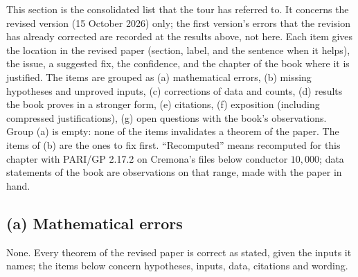 \begin{sloppypar}
This section is the consolidated list that the tour has referred to. It concerns the revised version (15 October 2026) only; the first version's errors that the
revision has already corrected are recorded at the results above, not here. Each item gives the location in the revised paper (section, label, and the sentence when
it helps), the issue, a suggested fix, the confidence, and the chapter of the book where it is justified. The items are grouped as (a) mathematical errors, (b) missing
hypotheses and unproved inputs, (c) corrections of data and counts, (d) results the book proves in a stronger form, (e) citations, (f) exposition (including compressed
justifications), (g) open questions with the book's observations. Group (a) is empty: none of the items invalidates a theorem of the paper. The items of (b) are the ones to
fix first. ``Recomputed'' means recomputed for this chapter with PARI/GP 2.17.2 on Cremona's files below conductor $10{,}000$; data statements of the book are observations on
that range, made with the paper in hand.

\subsection*{(a) Mathematical errors}
None. Every theorem of the revised paper is correct as stated, given the inputs it names; the items below concern hypotheses, inputs, data, citations and wording.


\end{sloppypar}
